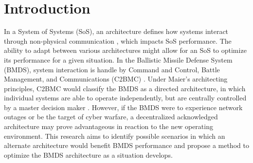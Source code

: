 \section{Introduction}

In a System of Systems (SoS), an architecture defines how systems interact through non-physical communication \cite{Maier1996}, which impacts SoS performance. The ability to adapt between various architectures might allow for an SoS to optimize its performance for a given situation. In the Ballistic Missile Defense System (BMDS), system interaction is handle by Command and Control, Battle Management, and Communications (C2BMC) \cite{MDA_C2BMC}. Under Maier's architecting principles, C2BMC would classify the BMDS as a directed architecture, in which individual systems are able to operate independently, but are centrally controlled by a master decision maker \cite{Maier1996}. However, if the BMDS were to experience network outages or be the target of cyber warfare, a decentralized acknowledged architecture may prove advantageous in reaction to the new operating environment. This research aims to identify possible scenarios in which an alternate architecture would benefit BMDS performance and propose a method to optimize the BMDS architecture as a situation develops.